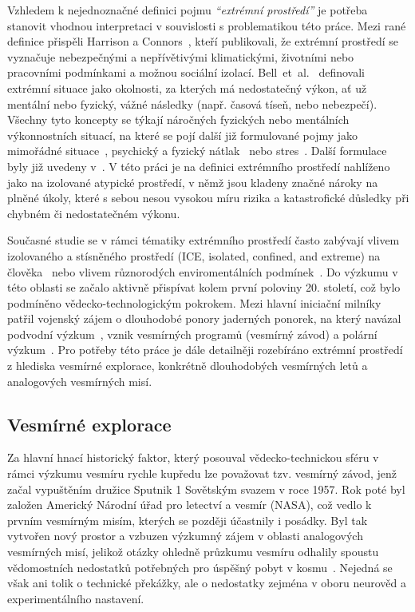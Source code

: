 Vzhledem k nejednoznačné definici pojmu \textit{\enquote{extrémní prostředí}} je
potřeba stanovit vhodnou interpretaci v souvislosti s problematikou této práce.
Mezi rané definice přispěli Harrison a Connors~\cite{harrison1984}, kteří
publikovali, že extrémní prostředí se vyznačuje nebezpečnými a nepřívětivými
klimatickými, životními nebo pracovními podmínkami a možnou sociální izolací.
Bell~et~al.~\cite{bell2016} definovali extrémní situace jako okolnosti, za
kterých má nedostatečný výkon, ať už mentální nebo fyzický, vážné následky
(např. časová tíseň, nebo nebezpečí). Všechny tyto koncepty se týkají náročných
fyzických nebo mentálních výkonnostních situací, na které se pojí další již
formulované pojmy jako mimořádné
situace~\cite{stachowski2009benefits,yu2008misery}, psychický a fyzický
nátlak~\cite{gardner2012performance} nebo stres~\cite{Staal2013StressCA}. Další
formulace byly již uvedeny
v~\cite{hannah2009framework,hallgren2018matter,golden2018teams}. V této práci je
na definici extrémního prostředí nahlíženo jako na izolované atypické prostředí,
v němž jsou kladeny značné nároky na plněné úkoly, které s sebou nesou vysokou
míru rizika a katastrofické důsledky při chybném či nedostatečném výkonu.

Současné studie se v rámci tématiky extrémního prostředí často zabývají vlivem
izolovaného a stísněného prostředí (\gls{ICE}, isolated, confined, and extreme)
na člověka~\cite{Pagel2016,golden2018teams} nebo vlivem různorodých
enviromentálních podmínek~\cite{Taylor2016,Winnard2019,Zhang2019}. Do výzkumu v
této oblasti se začalo aktivně přispívat kolem první poloviny 20. století, což
bylo podmíněno vědecko-technologickým pokrokem. Mezi hlavní iniciační milníky
patřil vojenský zájem o dlouhodobé ponory jaderných ponorek, na který navázal
podvodní výzkum~\cite{Maynard2018,Driskell2018}, vznik vesmírných programů
(vesmírný závod) a polární výzkum~\cite{wickman2008,stuster2007bold}. Pro
potřeby této práce je dále detailněji rozebíráno extrémní prostředí z hlediska
vesmírné explorace, konkrétně dlouhodobých vesmírných letů a analogových
vesmírných misí.

\subsection{Vesmírné explorace}
\label{subsection:vesmirne_explorace}
Za hlavní hnací historický faktor, který posouval vědecko-technickou sféru v
rámci výzkumu vesmíru rychle kupředu lze považovat tzv. vesmírný závod, jenž
začal vypuštěním družice Sputnik 1 Sovětským svazem v roce 1957. Rok poté byl
založen Americký Národní úřad pro letectví a vesmír (\gls{NASA}), což vedlo k
prvním vesmírným misím, kterých se později účastnily i posádky. Byl tak vytvořen
nový prostor a vzbuzen výzkumný zájem v oblasti analogových vesmírných misí,
jelikož otázky ohledně průzkumu vesmíru odhalily spoustu vědomostních nedostatků
potřebných pro úspěšný pobyt v kosmu~\cite{Driskell2018}. Nejedná se však ani
tolik o technické překážky, ale o nedostatky zejména v oboru neurověd a
experimentálního nastavení.

